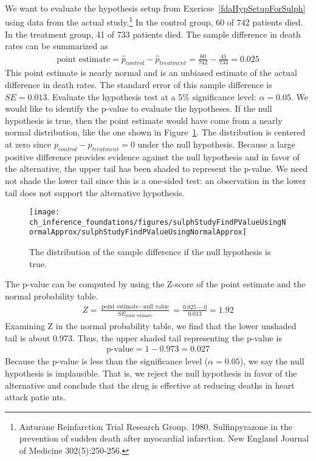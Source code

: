 \begin{example}{We want to evaluate the hypothesis setup from Exericse~\ref{fdaHypSetupForSulph} using data from the actual study.\footnote{Anturane Reinfarction Trial Research Group. 1980. Sulfinpyrazone in the prevention of sudden death after myocardial infarction. New England Journal of Medicine 302(5):250-256.} In the control group, 60 of 742 patients died. In the treatment group, 41 of 733 patients died. The sample difference in death rates can be summarized as
\begin{eqnarray*}
\text{point estimate} = \hat{p}_{control} - \hat{p}_{treatment} = \frac{60}{742} - \frac{41}{733} = 0.025
\end{eqnarray*}
This point estimate is nearly normal and is an unbiased estimate of the actual difference in death rates. The standard error of this sample difference is $SE = 0.013$. Evaluate the hypothesis test at a 5\% significance level: $\alpha=0.05$.}
We would like to identify the p-value to evaluate the hypotheses. If the null hypothesis is true, then the point estimate would have come from a nearly normal distribution, like the one shown in Figure~\ref{sulphStudyFindPValueUsingNormalApprox}. The distribution is centered at zero since $p_{control}-p_{treatment}=0$ under the null hypothesis. Because a large positive difference provides evidence against the null hypothesis and in favor of the alternative, the upper tail has been shaded to represent the p-value. We need not shade the lower tail since this is a one-sided test: an observation in the lower tail does not support the alternative hypothesis.

\begin{figure}[bt]
   \centering
   \texttt{[image: ch\_inference\_foundations/figures/sulphStudyFindPValueUsingNormalApprox/sulphStudyFindPValueUsingNormalApprox]}
   \caption{The distribution of the sample difference if the null hypothesis is true.}
   \label{sulphStudyFindPValueUsingNormalApprox}
\end{figure}

The p-value can be computed by using the Z-score of the point estimate and the normal probability table.
\begin{eqnarray}
Z = \frac{\text{point estimate} - \text{null value}}{SE_{\text{point estimate}}}
	= \frac{0.025 - 0}{0.013} = 1.92
\label{zScoreOfPointEstimateForSulphinpyrazoneThisIsFirstTestStatReference}
\end{eqnarray}
Examining Z in the normal probability table, we find that the lower unshaded tail is about 0.973. Thus, the upper shaded tail representing the p-value is
\begin{eqnarray*}
\text{p-value} = 1-0.973 = 0.027
\end{eqnarray*}
Because the p-value is less than the significance level ($\alpha=0.05$), we say the null hypothesis is implausible. That is, we reject the null hypothesis in favor of the alternative and conclude that the drug is effective at reducing deaths in heart attack patie
nts.
\end{example}

